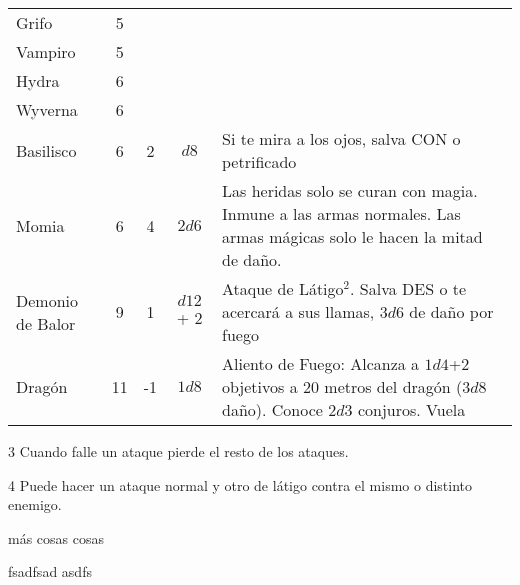 \begin{table*}[p]
\begin{threeparttable}
\begin{tabular}{lcccp{8cm}}
Grifo                & 5 \\
Vampiro              & 5 \\
Hydra                & 6 \\
Wyverna              & 6 \\
Basilisco            & 6 & 2 &$  d8$ & Si te mira a los ojos, salva CON o petrificado\\
Momia                & 6 & 4 & $ 2d6$ & Las heridas solo se curan con magia. Inmune a las armas normales. Las armas mágicas solo le hacen la mitad de daño.\\
Demonio de Balor     & 9 & 1 &$  d12$ + 2 & Ataque de Látigo$^2$. Salva DES o te acercará a sus llamas, $ 3d6$ de daño por fuego \\
Dragón               & 11  & -1 & $ 1d8$ & Aliento de Fuego: Alcanza a $ 1d4$+2 objetivos a 20 metros del dragón ($ 3d8$ daño). Conoce $ 2d3$ conjuros. Vuela\\
\bottomrule
\bottomrule
\end{tabular}
\begin{tablenotes}
\item 3 Cuando falle un ataque pierde el resto de los ataques.
\item 4 Puede hacer un ataque normal y otro de látigo contra el mismo o distinto enemigo.
\end{tablenotes}
\end{threeparttable}
\end{table*}



más cosas cosas

fsadfsad
asdfs

